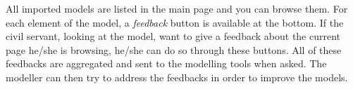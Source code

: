 \documentclass{learnpad}
\begin{document}
All imported models are listed in the main page and you can browse them.  For
each element of the model, a \textit{feedback} button is available at the 
bottom. If the civil servant, looking at the model, want to give a feedback 
about the current page he/she is browsing, he/she can do so through these buttons.  All of 
these feedbacks are aggregated and sent to the modelling tools when asked.  The 
modeller can then try to address the feedbacks in order to improve the models.







 

\end{document}
